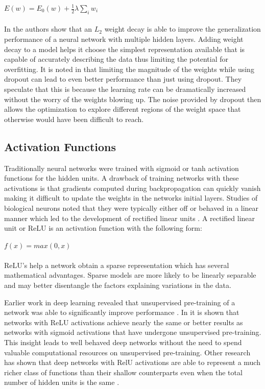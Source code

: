 \documentclass[12pt,letterpaper]{article}
\begin{document}
$E(w) = E_0(w) + \frac{1}{2} \lambda \sum_i w_i$
\\
\\
In \cite{Krogh92asimple} the authors show that an $L_2$ weight decay is able to improve the generalization performance of a neural network with multiple hidden layers.  Adding weight decay to a model helps it choose the simplest representation available that is capable of accurately describing the data thus limiting the potential for overfitting.  It is noted in \cite{Srivastava:2014:DSW:2627435.2670313} that limiting the magnitude of the weights while using dropout can lead to even better performance than just using dropout.  They speculate that this is because the learning rate can be dramatically increased without the worry of the weights blowing up.  The noise provided by dropout then allows the optimization to explore different regions of the weight space that otherwise would have been difficult to reach.

\subsection{Activation Functions}
Traditionally neural networks were trained with sigmoid or tanh activation functions for the hidden units.  A drawback of training networks with these activations is that gradients computed during backpropagation can quickly vanish making it difficult to update the weights in the networks initial layers.  Studies of biological neurons noted that they were typically either off or behaved in a linear manner which led to the development of rectified linear units  \cite{AISTATS2011_GlorotBB11}. A rectified linear unit or ReLU is an activation function with the following form:

$f(x) = max(0,x)$
\\
\\
ReLU's help a network obtain a sparse representation which has several mathematical advantages. Sparse models are more likely to be linearly separable and may better disentangle the factors explaining variations in the data.

Earlier work in deep learning revealed that unsupervised pre-training of a network was able to significantly improve performance \cite{Vincent:2010:SDA:1756006.1953039}.  In \cite{AISTATS2011_GlorotBB11} it is shown that networks with ReLU activations achieve nearly the same or better results as networks with sigmoid activations that have undergone unsupervised pre-training.  This insight leads to well behaved deep networks without the need to spend valuable computational resources on unsupervised pre-training.  Other research has shown that deep networks with RelU activations are able to represent a much richer class of functions than their shallow counterparts even when the total number of hidden units is the same \cite{2013arXiv1312.6098P}.
\end{document}
